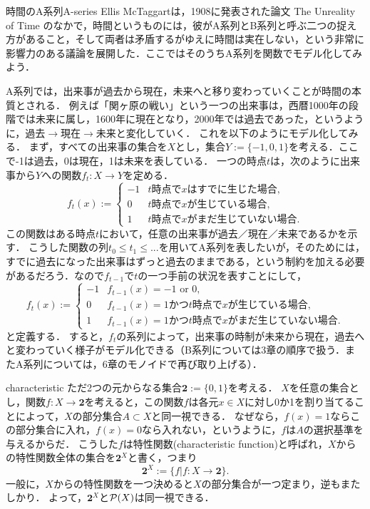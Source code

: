 \documentclass[dvipdfmx, 11pt,a4paper]{jsarticle}
\begin{document}
\begin{rei}{時間のA系列}{A-series}
Ellis McTaggartは，1908に発表された論文 The Unreality of Time のなかで，時間というものには，彼がA系列とB系列と呼ぶ二つの捉え方があること，そして両者は矛盾するがゆえに時間は実在しない，という非常に影響力のある議論を展開した．ここではそのうちA系列を関数でモデル化してみよう．

A系列では，出来事が過去から現在，未来へと移り変わっていくことが時間の本質とされる．
例えば「関ヶ原の戦い」という一つの出来事は，西暦1000年の段階では未来に属し，1600年に現在となり，2000年では過去であった，というように，過去$\to$現在$\to$未来と変化していく．
これを以下のようにモデル化してみる．
まず，すべての出来事の集合を$X$とし，集合$Y:= \{-1, 0, 1\}$を考える．ここで-1は過去，0は現在，1は未来を表している．
一つの時点$t$は，次のように出来事から$Y$への関数$f_t: X \to Y$を定める．
\[
  f_t(x) :=
  \begin{cases}
    -1      & \text{$t$時点で$x$はすでに生じた場合,} \\
    0       & \text{$t$時点で$x$が生じている場合,} \\
    1       & \text{$t$時点で$x$がまだ生じていない場合.}
  \end{cases}
\]
この関数はある時点$t$において，任意の出来事が過去／現在／未来であるかを示す．
こうした関数の列$t_0 \leq t_1 \leq ... $を用いてA系列を表したいが，そのためには，すでに過去になった出来事はずっと過去のままである，という制約を加える必要があるだろう．なので$f_{t-1}$で$t$の一つ手前の状況を表すことにして，
\[
  f_{t}(x) :=
  \begin{cases}
    -1      & \text{$f_{t-1}(x) = -1$ or $0$,} \\
    0       & \text{$f_{t-1}(x) = 1$かつ$t$時点で$x$が生じている場合,} \\
    1       & \text{$f_{t-1}(x) = 1$かつ$t$時点で$x$がまだ生じていない場合.}
  \end{cases}
\]
と定義する．
すると，$f_t$の系列によって，出来事の時制が未来から現在，過去へと変わっていく様子がモデル化できる（B系列については3章の順序で扱う．またA系列については，6章のモノイドで再び取り上げる）．
\end{rei}



\begin{hatten}{}{characteristic}
ただ2つの元からなる集合$\mathbf{2} := \{0, 1\}$を考える．
$X$を任意の集合とし，関数$f:X \to \mathbf{2}$を考えると，この関数$f$は各元$x \in X$に対し0か1を割り当てることによって，$X$の部分集合$A \subset X$と同一視できる．
なぜなら，$f(x)=1$ならこの部分集合に入れ，$f(x)=0$なら入れない，というように，$f$は$A$の選択基準を与えるからだ．
こうした$f$は特性関数(characteristic function)と呼ばれ，$X$からの特性関数全体の集合を$\mathbf{2}^X$と書く，つまり
\[
 \mathbf{2}^X := \{ f|f:X \to \mathbf{2}\}.
\]
一般に，$X$からの特性関数を一つ決めると$X$の部分集合が一つ定まり，逆もまたしかり．
よって，$\mathbf{2}^X$と$\mathcal{P}(X)$は同一視できる．
\end{hatten}
\end{document}
